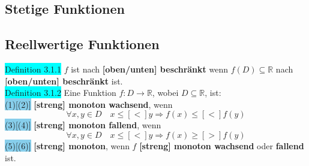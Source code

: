 \documentclass[landscape, 10pt]{article}
\newcommand{\R}{\mathbb{R}}
\begin{document}
\begin{multicols}{3}
\section{Stetige Funktionen}
       \subsection{Reellwertige Funktionen}
              \colorbox{cyan}{Definition 3.1.1} 
                     $f$ ist nach 
                     \textbf{[oben/unten] beschränkt} wenn 
                     \textcolor{NavyBlue}{$f(D)\subseteq\R$} 
                     nach \textbf{[oben/unten] beschränkt} ist.\\
              \colorbox{cyan}{Definition 3.1.2} 
                     Eine Funktion 
                     \textcolor{NavyBlue}{$f:D\longrightarrow\R$}, wobei 
                     \textcolor{NavyBlue}{$D\subseteq\R$}, ist:\\
                     \colorbox{SkyBlue}{(1)[(2)]}
                            \textbf{[streng] monoton 
                            wachsend}, wenn 
                            \begin{equation*}
                                   \forall x,y\in D\quad 
                                   x\leqslant [<]y\Rightarrow
                                   f(x)\leqslant [<]f(y)
                            \end{equation*}
                     \colorbox{SkyBlue}{(3)[(4)]}
                            \textbf{[streng] monoton 
                            fallend}, wenn 
                            \begin{equation*}
                                   \forall x,y\in D\quad 
                                   x\leqslant [<]y\Rightarrow
                                   f(x)\geqslant [>]f(y)
                            \end{equation*}
                     \colorbox{SkyBlue}{(5)[(6)]} 
                            \textbf{[streng] monoton}, 
                            wenn \textcolor{NavyBlue}{$f$} 
                            \textbf{[streng] monoton wachsend} oder 
                            \textbf{fallend} ist.\\

\end{multicols}
\end{document}
